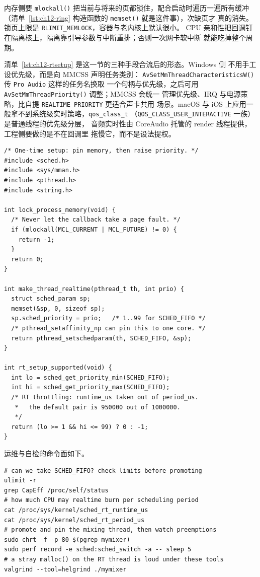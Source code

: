 \documentclass[12pt,a4paper,fontset=fandol]{ctexbook}
\newcommand{\Fn}[1]{\texttt{#1()}}
\newcommand{\Tp}[1]{\texttt{#1}}
\begin{document}
内存侧要 \Fn{mlockall} 把当前与将来的页都锁住，配合启动时遍历一遍所有缓冲
（清单~\ref{lst:ch12-ring} 构造函数的 \Fn{memset} 就是这件事），次缺页才
真的消失。锁页上限是 \Tp{RLIMIT\_MEMLOCK}，容器与老内核上默认很小。
CPU 亲和性把回调钉在隔离核上，隔离靠引导参数与中断重排；否则一次网卡软中断
就能吃掉整个周期。

清单~\ref{lst:ch12-rtsetup} 是这一节的三种手段合流后的形态。Windows 侧
不用手工设优先级，而是向 MMCSS 声明任务类别：
\Fn{AvSetMmThreadCharacteristicsW} 传 \Tp{Pro Audio} 这样的任务名换取
一个句柄与优先级，之后可用 \Fn{AvSetMmThreadPriority} 调整；MMCSS 会统一
管理优先级、IRQ 与电源策略，比自提 \Tp{REALTIME\_PRIORITY} 更适合声卡共用
场景。macOS 与 iOS 上应用一般拿不到系统级实时策略，\Tp{qos\_class\_t}
（\Tp{QOS\_CLASS\_USER\_INTERACTIVE} 一族）是普通线程的优先级分层，
音频实时性由 CoreAudio 托管的 render 线程提供，工程侧要做的是不在回调里
拖慢它，而不是设法提权。

\begin{lstlisting}[style=cstyle,caption={锁页、提权与配额自检},label={lst:ch12-rtsetup}]
/* One-time setup: pin memory, then raise priority. */
#include <sched.h>
#include <sys/mman.h>
#include <pthread.h>
#include <string.h>

int lock_process_memory(void) {
  /* Never let the callback take a page fault. */
  if (mlockall(MCL_CURRENT | MCL_FUTURE) != 0) {
    return -1;
  }
  return 0;
}

int make_thread_realtime(pthread_t th, int prio) {
  struct sched_param sp;
  memset(&sp, 0, sizeof sp);
  sp.sched_priority = prio;   /* 1..99 for SCHED_FIFO */
  /* pthread_setaffinity_np can pin this to one core. */
  return pthread_setschedparam(th, SCHED_FIFO, &sp);
}

int rt_setup_supported(void) {
  int lo = sched_get_priority_min(SCHED_FIFO);
  int hi = sched_get_priority_max(SCHED_FIFO);
  /* RT throttling: runtime_us taken out of period_us.
   *   the default pair is 950000 out of 1000000.
   */
  return (lo >= 1 && hi <= 99) ? 0 : -1;
}
\end{lstlisting}

运维与自检的命令面如下。

\begin{lstlisting}[style=shellstyle,caption={实时配置的确认与抢占观测},label={lst:ch12-rtshell}]
# can we take SCHED_FIFO? check limits before promoting
ulimit -r
grep CapEff /proc/self/status
# how much CPU may realtime burn per scheduling period
cat /proc/sys/kernel/sched_rt_runtime_us
cat /proc/sys/kernel/sched_rt_period_us
# promote and pin the mixing thread, then watch preemptions
sudo chrt -f -p 80 $(pgrep mymixer)
sudo perf record -e sched:sched_switch -a -- sleep 5
# a stray malloc() on the RT thread is loud under these tools
valgrind --tool=helgrind ./mymixer
\end{lstlisting}
\end{document}
